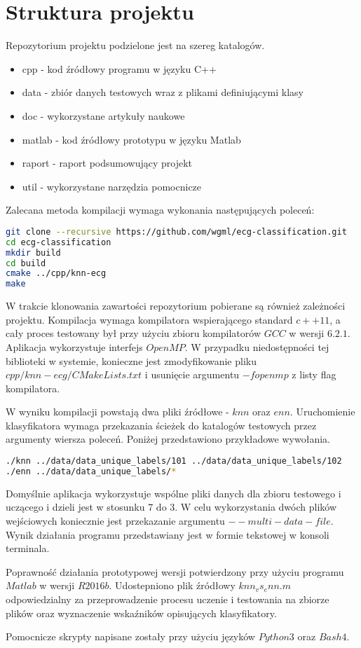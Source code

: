 \section{Struktura projektu}
Repozytorium projektu podzielone jest na szereg katalogów.
\begin{itemize}  
	\item cpp - kod źródłowy programu w języku C++ 
	\item data - zbiór danych testowych wraz z plikami definiującymi klasy
	\item doc - wykorzystane artykuły naukowe
	\item matlab - kod źródłowy prototypu w języku Matlab
	\item raport - raport podsumowujący projekt
	\item util - wykorzystane narzędzia pomocnicze
\end{itemize}


Zalecana metoda kompilacji wymaga wykonania następujących poleceń:
\begin{lstlisting}[language=bash,caption=Kompilacja programu]
git clone --recursive https://github.com/wgml/ecg-classification.git
cd ecg-classification
mkdir build
cd build
cmake ../cpp/knn-ecg
make
\end{lstlisting}

W trakcie klonowania zawartości repozytorium pobierane są również zależności projektu. Kompilacja wymaga kompilatora wspierającego standard $c++11$, a cały proces testowany był przy użyciu zbioru kompilatorów $GCC$ w wersji $6.2.1$. Aplikacja wykorzystuje interfejs $OpenMP$. W przypadku niedostępności tej biblioteki w systemie, konieczne jest zmodyfikowanie pliku $cpp/knn-ecg/CMakeLists.txt$ i usunięcie argumentu $-fopenmp$ z listy flag kompilatora.

W wyniku kompilacji powstają dwa pliki źródłowe - $knn$ oraz $enn$.
Uruchomienie klasyfikatora wymaga przekazania ścieżek do katalogów testowych przez argumenty wiersza poleceń. Poniżej przedstawiono przykładowe wywołania.

\begin{lstlisting}[language=bash,caption=Uruchamianie aplikacji]
./knn ../data/data_unique_labels/101 ../data/data_unique_labels/102
./enn ../data/data_unique_labels/*
\end{lstlisting}

Domyślnie aplikacja wykorzystuje wspólne pliki danych dla zbioru testowego i uczącego i dzieli jest w stosunku 7 do 3. W celu wykorzystania dwóch plików wejściowych koniecznie jest przekazanie argumentu $--multi-data-file$.
Wynik działania programu przedstawiany jest w formie tekstowej w konsoli terminala.

Poprawność działania prototypowej wersji potwierdzony przy użyciu programu $Matlab$ w wersji $R2016b$. Udostepniono plik źródłowy $knn_vs_enn.m$ odpowiedzialny za przeprowadzenie procesu uczenie i testowania na zbiorze plików oraz wyznaczenie wskaźników opisujących klasyfikatory.

Pomocnicze skrypty napisane zostały przy użyciu języków $Python 3$ oraz $Bash 4$.